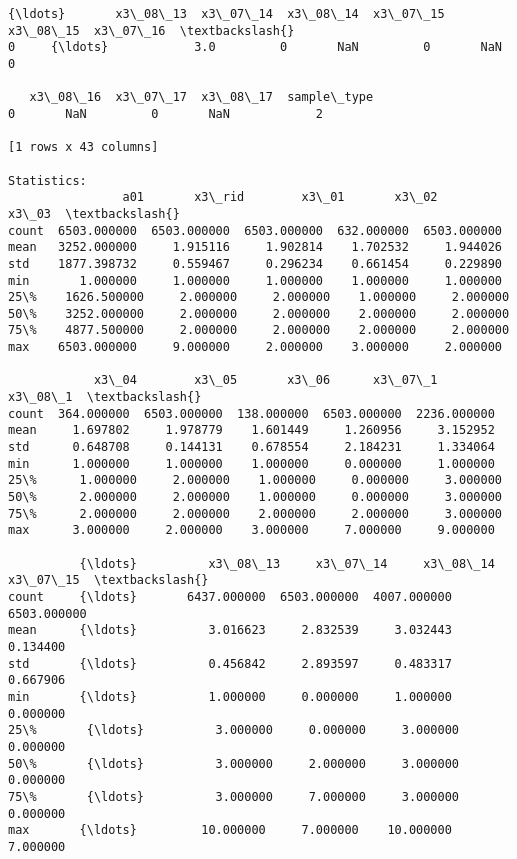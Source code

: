 \documentclass[11pt]{article}
\begin{document}
\begin{Verbatim}[commandchars=\\\{\}]
      {\ldots}       x3\_08\_13  x3\_07\_14  x3\_08\_14  x3\_07\_15  x3\_08\_15  x3\_07\_16  \textbackslash{}
0     {\ldots}            3.0         0       NaN         0       NaN         0   

   x3\_08\_16  x3\_07\_17  x3\_08\_17  sample\_type  
0       NaN         0       NaN            2  

[1 rows x 43 columns]

Statistics: 
                a01       x3\_rid        x3\_01       x3\_02        x3\_03  \textbackslash{}
count  6503.000000  6503.000000  6503.000000  632.000000  6503.000000   
mean   3252.000000     1.915116     1.902814    1.702532     1.944026   
std    1877.398732     0.559467     0.296234    0.661454     0.229890   
min       1.000000     1.000000     1.000000    1.000000     1.000000   
25\%    1626.500000     2.000000     2.000000    1.000000     2.000000   
50\%    3252.000000     2.000000     2.000000    2.000000     2.000000   
75\%    4877.500000     2.000000     2.000000    2.000000     2.000000   
max    6503.000000     9.000000     2.000000    3.000000     2.000000   

            x3\_04        x3\_05       x3\_06      x3\_07\_1      x3\_08\_1  \textbackslash{}
count  364.000000  6503.000000  138.000000  6503.000000  2236.000000   
mean     1.697802     1.978779    1.601449     1.260956     3.152952   
std      0.648708     0.144131    0.678554     2.184231     1.334064   
min      1.000000     1.000000    1.000000     0.000000     1.000000   
25\%      1.000000     2.000000    1.000000     0.000000     3.000000   
50\%      2.000000     2.000000    1.000000     0.000000     3.000000   
75\%      2.000000     2.000000    2.000000     2.000000     3.000000   
max      3.000000     2.000000    3.000000     7.000000     9.000000   

          {\ldots}          x3\_08\_13     x3\_07\_14     x3\_08\_14     x3\_07\_15  \textbackslash{}
count     {\ldots}       6437.000000  6503.000000  4007.000000  6503.000000   
mean      {\ldots}          3.016623     2.832539     3.032443     0.134400   
std       {\ldots}          0.456842     2.893597     0.483317     0.667906   
min       {\ldots}          1.000000     0.000000     1.000000     0.000000   
25\%       {\ldots}          3.000000     0.000000     3.000000     0.000000   
50\%       {\ldots}          3.000000     2.000000     3.000000     0.000000   
75\%       {\ldots}          3.000000     7.000000     3.000000     0.000000   
max       {\ldots}         10.000000     7.000000    10.000000     7.000000   


\end{Verbatim}
\end{document}
